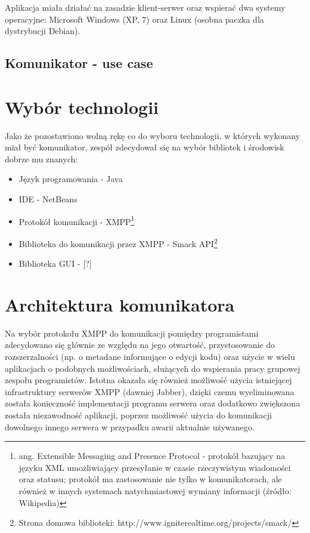 \documentclass[polish,11pt,a4paper,twoside]{article}
\begin{document}
Aplikacja miała działać na zasadzie klient-serwer oraz wspierać dwa systemy operacyjne: Microsoft Windows (XP, 7) oraz Linux (osobna paczka dla dystrybucji Debian).

\subsection{Komunikator - use case}

\section{Wybór technologii}

Jako że pozostawiono wolną rękę co do wyboru technologii, w których wykonany miał być komunikator, zespół zdecydował się na wybór bibliotek i środowisk dobrze mu znanych:
\begin{itemize}
\item Język programowania - Java
\item IDE - NetBeans
\item Protokół komunikacji - XMPP\footnote{ang. Extensible Messaging and Presence Protocol - protokół bazujący na języku XML umożliwiający przesyłanie w czasie rzeczywistym wiadomości oraz statusu; protokół ma zastosowanie nie tylko w komunikatorach, ale również w innych systemach natychmiastowej wymiany informacji (źródło: Wikipedia)}
\item Biblioteka do komunikacji przez XMPP - Smack API\footnote{Strona domowa biblioteki: http://www.igniterealtime.org/projects/smack/}
\item Biblioteka GUI - [?]
\end{itemize}

\section{Architektura komunikatora}

Na wybór protokołu XMPP do komunikacji pomiędzy programistami zdecydowano się głównie ze względu na jego otwartość, przystosowanie do rozszerzalności (np. o metadane informujące o edycji kodu) oraz użycie w wielu aplikacjach o podobnych możliwościach, służących do wspierania pracy grupowej zespołu programistów. Istotna okazała się również możliwość użycia istniejącej infrastruktury serwerów XMPP (dawniej Jabber), dzięki czemu wyeliminowana została konieczność implementacji programu serwera oraz dodatkowo zwiększona została niezawodność aplikacji, poprzez możliwość użycia do komunikacji dowolnego innego serwera w przypadku awarii aktualnie używanego.
\end{document}
